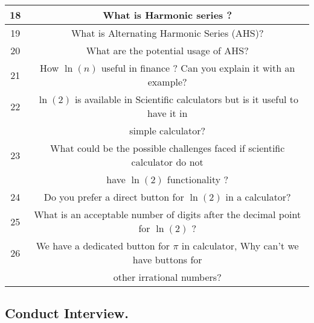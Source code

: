 \documentclass{article}
\begin{document}
\begin{table}[ht!]
\begin{tabular}{|| c | c ||}
         \hline
         18 & What is Harmonic series ? \\
         \hline
         19 & What is Alternating Harmonic Series (AHS)? \\
         \hline
         20 & What are the potential usage of AHS? \\
         \hline
         21 & How $\ln(n)$ useful in finance ? Can you explain it with an example?\\
         \hline
         22 & $\ln(2)$ is available in Scientific calculators but is it useful to have it in \\
         & simple calculator?\\
         \hline
         23 & What could be the possible challenges faced if scientific calculator do not \\
         & have $\ln(2)$ functionality ?\\
         \hline
         24 & Do you prefer a direct button for $\ln(2)$ in a calculator?\\
         \hline
         25 & What is an acceptable number of digits after the decimal point for $\ln(2)$ ?\\
         \hline
         26 & We have a dedicated button for $\pi$ in calculator, Why can't we have buttons for \\
         &other irrational numbers?\\
         \bottomrule
    \end{tabular}
\end{table}
\newpage

\subsection{Conduct Interview.}
\end{document}

